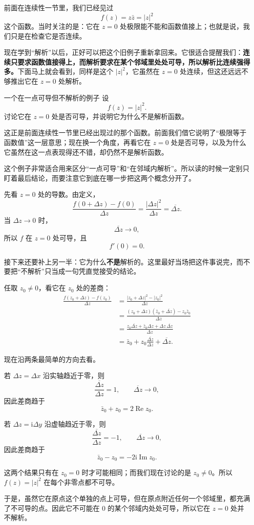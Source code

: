 \begin{tishi}[把前面的连续性例子接回来]
前面在连续性一节里，我们已经见过
\[
    f(z)=z\bar z=|z|^2
\]
这个函数。当时关注的是：它在 $z=0$ 处极限能不能和函数值接上；也就是说，我们只是在检查它是否连续。

现在学到``解析''以后，正好可以把这个旧例子重新拿回来。它很适合提醒我们：\textbf{连续只要求函数值接得上，而解析要求在某个邻域里处处可导，所以解析比连续强得多。}下面马上就会看到，同样是这个 $|z|^2$，它虽然在 $z=0$ 处连续，但这还远远不够推出它在 $z=0$ 处解析。
\end{tishi}

\begin{lizi}{一个在一点可导但不解析的例子}{}
设
\[
    f(z)=|z|^2.
\]
讨论它在 $z=0$ 处是否可导，并说明它为什么不是解析函数。

\begin{jie}
这正是前面连续性一节里已经出现过的那个函数。前面我们借它说明了``极限等于函数值''这一层意思；现在换一个角度，再看它在 $z=0$ 处是否可导，以及为什么它虽然在这一点表现得还不错，却仍然不是解析函数。

这个例子非常适合用来区分``一点可导''和``在邻域内解析''。所以读的时候一定别只盯着最后结论，而要注意它到底在哪一步把这两个概念分开了。

先看 $z=0$ 处的导数。由定义，
\[
    \frac{f(0+\Delta z)-f(0)}{\Delta z}
    =\frac{|\Delta z|^2}{\Delta z}
    =\overline{\Delta z}.
\]
当 $\Delta z\to 0$ 时，
\[
    \overline{\Delta z}\to 0,
\]
所以 $f$ 在 $z=0$ 处可导，且
\[
    f'(0)=0.
\]

接下来还要补上另一半：它为什么\textbf{不是}解析的。这里最好当场把这件事说完，而不要把``不解析''只当成一句凭直觉接受的结论。

任取 $z_0\neq 0$，看它在 $z_0$ 处的差商：
\begin{align*}
    \frac{f(z_0+\Delta z)-f(z_0)}{\Delta z}
    &=\frac{|z_0+\Delta z|^2-|z_0|^2}{\Delta z}\\
    &=\frac{(z_0+\Delta z)(\bar z_0+\overline{\Delta z})-z_0\bar z_0}{\Delta z}\\
    &=\frac{z_0\overline{\Delta z}+\bar z_0\Delta z+\Delta z\,\overline{\Delta z}}{\Delta z}\\
    &=\bar z_0+z_0\frac{\overline{\Delta z}}{\Delta z}+\overline{\Delta z}.
\end{align*}

现在沿两条最简单的方向去看。

若 $\Delta z=\Delta x$ 沿实轴趋近于零，则
\[
    \frac{\overline{\Delta z}}{\Delta z}=1,\qquad \overline{\Delta z}\to 0,
\]
因此差商趋于
\[
    \bar z_0+z_0=2\operatorname{Re}z_0.
\]

若 $\Delta z=\mathrm{i}\Delta y$ 沿虚轴趋近于零，则
\[
    \frac{\overline{\Delta z}}{\Delta z}=-1,\qquad \overline{\Delta z}\to 0,
\]
因此差商趋于
\[
    \bar z_0-z_0=-2\mathrm{i}\operatorname{Im}z_0.
\]

这两个结果只有在 $z_0=0$ 时才可能相同；而我们现在讨论的是 $z_0\neq 0$。所以 $f(z)=|z|^2$ 在每个非零点都不可导。

于是，虽然它在原点这个单独的点上可导，但在原点附近任何一个邻域里，都充满了不可导的点。因此它不可能在 $0$ 的某个邻域内处处可导，所以它在 $z=0$ 处并不解析。
\end{jie}
\end{lizi}

